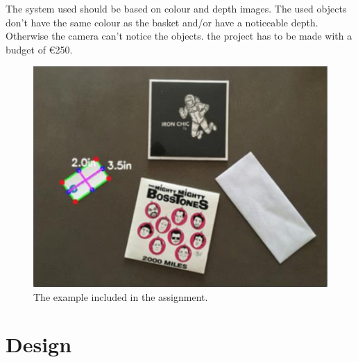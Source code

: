 \documentclass[11pt]{article}
\begin{document}
\noindent The system used should be based on colour and depth images. The used objects don't have the same colour as the basket and/or have a noticeable depth. Otherwise the camera can't notice the objects. the project has to be made with a budget of \euro 250.\\

\begin{figure}[h!]
\centering
  \includegraphics[width=0.7\linewidth]{opdracht.png}
  \caption{The example included in the assignment.}
  \label{fig:example}
\end{figure}



\section{Design}
\end{document}
